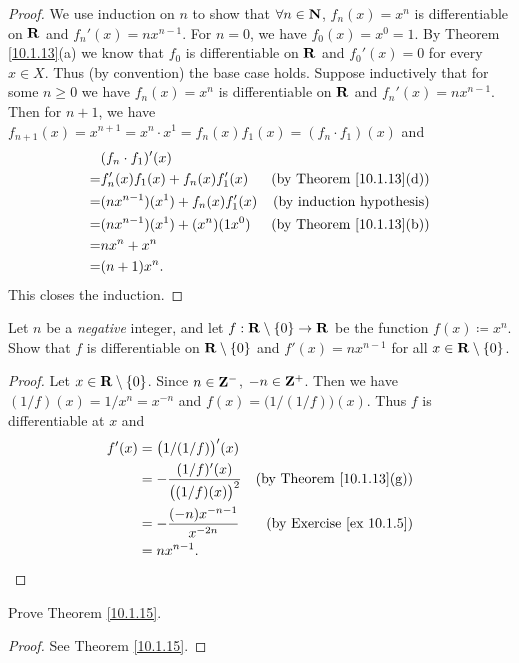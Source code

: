\begin{proof}
    We use induction on \(n\) to show that \(\forall n \in \mathbf{N}\), \(f_n(x) = x^n\) is differentiable on \(\mathbf{R}\) and \(f_n'(x) = n x^{n - 1}\).
    For \(n = 0\), we have \(f_0(x) = x^0 = 1\).
    By Theorem \ref{10.1.13}(a) we know that \(f_0\) is differentiable on \(\mathbf{R}\) and \(f_0'(x) = 0\) for every \(x \in X\).
    Thus (by convention) the base case holds.
    Suppose inductively that for some \(n \geq 0\) we have \(f_n(x) = x^n\) is differentiable on \(\mathbf{R}\) and \(f_n'(x) = n x^{n - 1}\).
    Then for \(n + 1\), we have \(f_{n + 1}(x) = x^{n + 1} = x^n \cdot x^1 = f_n(x) f_1(x) = (f_n \cdot f_1)(x)\) and
    \begin{align*}
          & (f_n \cdot f_1)'(x)                                                        \\
        = & f_n'(x) f_1(x) + f_n(x) f_1'(x)     & \text{(by Theorem \ref{10.1.13}(d))} \\
        = & (n x^{n - 1})(x^1) + f_n(x) f_1'(x) & \text{(by induction hypothesis)}     \\
        = & (n x^{n - 1})(x^1) + (x^n)(1 x^0)   & \text{(by Theorem \ref{10.1.13}(b))} \\
        = & n x^n + x^n                                                                \\
        = & (n + 1) x^n.
    \end{align*}
    This closes the induction.
\end{proof}

\begin{exercise}\label{ex 10.1.6}
    Let \(n\) be a \emph{negative} integer, and let \(f : \mathbf{R} \setminus \{0\} \to \mathbf{R}\) be the function \(f(x) \coloneqq x^n\).
    Show that \(f\) is differentiable on \(\mathbf{R} \setminus \{0\}\) and \(f'(x) = n x^{n - 1}\) for all \(x \in \mathbf{R} \setminus \{0\}\).
\end{exercise}

\begin{proof}
    Let \(x \in \mathbf{R} \setminus \{0\}\).
    Since \(n \in \mathbf{Z}^-\), \(-n \in \mathbf{Z}^+\).
    Then we have \((1 / f)(x) = 1 / x^n = x^{-n}\) and \(f(x) = \big(1 / (1 / f)\big)(x)\).
    Thus \(f\) is differentiable at \(x\) and
    \begin{align*}
        f'(x) & = \big(1 / (1 / f)\big)'(x)                                                          \\
              & = -\frac{(1 / f)'(x)}{\big((1 / f)(x)\big)^2} & \text{(by Theorem \ref{10.1.13}(g))} \\
              & = -\frac{(-n) x^{-n - 1}}{x^{-2n}}            & \text{(by Exercise \ref{ex 10.1.5})} \\
              & = n x^{n - 1}.
    \end{align*}
\end{proof}

\begin{exercise}\label{ex 10.1.7}
    Prove Theorem \ref{10.1.15}.
\end{exercise}

\begin{proof}
    See Theorem \ref{10.1.15}.
\end{proof}
